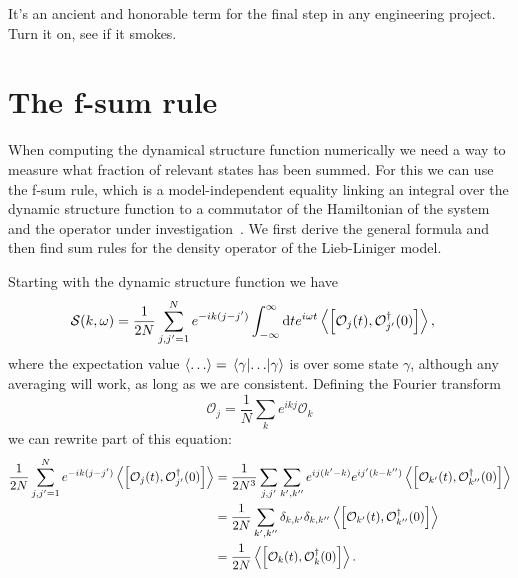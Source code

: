 \documentclass[11pt, a4paper]{report} %
\begin{document}
\begin{savequote}[50mm]
It's an ancient and honorable term for the final step in any engineering project. Turn it on, see if it smokes.
\end{savequote}

\chapter{The f-sum rule}\label{cha:f-sum-rule}

When computing the dynamical structure function numerically we need a way to measure what fraction of relevant states has been summed.
For this we can use the f-sum rule, which is a model-independent equality linking an integral over the dynamic structure function to a commutator of the Hamiltonian of the system and the operator under investigation~\cite{pitaevskii}.
We first derive the general formula and then find sum rules for the density operator of the Lieb-Liniger model.

Starting with the dynamic structure function we have
\begin{align}
  	\mathcal{S}(k,\omega) &= \frac{1}{2N} \sum_{j,j'=1}^{N} e^{-ik(j-j')} \int_{-\infty}^{\infty}\dd t e^{i\omega t}\expval{\qty[\mathcal{O}_j(t),\mathcal{O}_{j'}^{\dagger}(0)]},
\end{align}
where the expectation value \(\expval{\ldots} = \matrixel{\gamma}{\ldots}{\gamma}\) is over some state \(\gamma\), although any averaging will work, as long as we are consistent.
Defining the Fourier transform
\begin{equation}
  \mathcal{O}_j = \frac{1}{N} \sum_k e^{ikj} \mathcal{O}_k
\end{equation}
we can rewrite part of this equation:
\begin{align}
  \frac{1}{2N} \sum_{j,j'=1}^{N} e^{-ik(j-j')} \expval{\qty[\mathcal{O}_j(t),\mathcal{O}_{j'}^{\dagger}(0)]} &= \frac{1}{2N^3} \sum_{j, j'}\sum_{k',k''} e^{ij(k'-k)}e^{ij'(k-k'')}  \expval{\qty[\mathcal{O}_{k'}(t),\mathcal{O}_{k''}^{\dagger}(0)]}\\
&= \frac{1}{2N} \sum_{k',k''} \delta_{k,k'}\delta_{k,k''}  \expval{\qty[\mathcal{O}_{k'}(t),\mathcal{O}_{k''}^{\dagger}(0)]} \\
&= \frac{1}{2N}  \expval{\qty[\mathcal{O}_{k}(t),\mathcal{O}_{k}^{\dagger}(0)]}.
\end{align}
\end{document}
